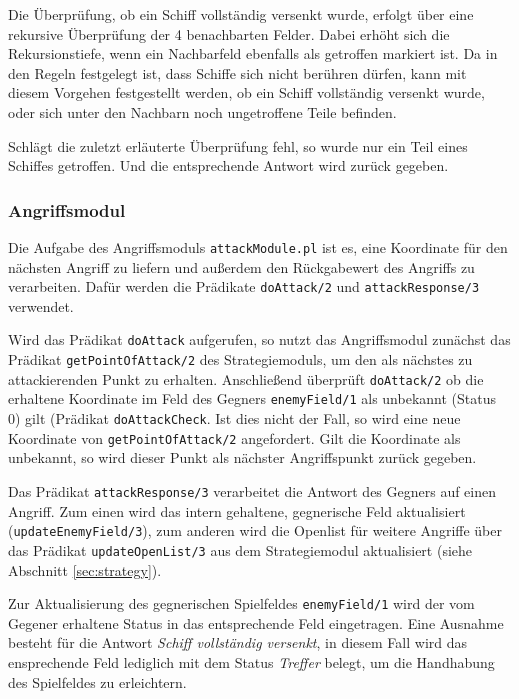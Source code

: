	Die Überprüfung, ob ein Schiff vollständig versenkt wurde, erfolgt über eine rekursive Überprüfung der 4 benachbarten Felder.
	Dabei erhöht sich die Rekursionstiefe, wenn ein Nachbarfeld ebenfalls als getroffen markiert ist. 
	Da in den Regeln festgelegt ist, dass Schiffe sich nicht berühren dürfen, kann mit diesem Vorgehen festgestellt werden, ob ein Schiff
	vollständig versenkt wurde, oder sich unter den Nachbarn noch ungetroffene Teile befinden.
	
	Schlägt die zuletzt erläuterte Überprüfung fehl, so wurde nur ein Teil eines Schiffes getroffen. Und die entsprechende Antwort wird zurück 
	gegeben.
	
	
	
\subsubsection{Angriffsmodul} \label{sec:attackModule}
	Die Aufgabe des Angriffsmoduls \texttt{attackModule.pl} ist es, eine Koordinate für den nächsten Angriff zu liefern und außerdem den 
	Rückgabewert des Angriffs zu verarbeiten. 
	Dafür werden die Prädikate \texttt{doAttack/2} und \texttt{attackResponse/3} verwendet. 
	
	Wird das Prädikat \texttt{doAttack} aufgerufen, so nutzt das Angriffsmodul zunächst das Prädikat \texttt{getPointOfAttack/2} des
	Strategiemoduls, um den als nächstes zu attackierenden Punkt zu erhalten. Anschließend überprüft \texttt{doAttack/2} 
	ob die erhaltene Koordinate im Feld des Gegners \texttt{enemyField/1} als unbekannt (Status 0) gilt (Prädikat \texttt{doAttackCheck}. 
	Ist dies nicht der Fall, so wird eine neue Koordinate von \texttt{getPointOfAttack/2} angefordert. 
	Gilt die Koordinate als unbekannt, so wird dieser Punkt als nächster Angriffspunkt zurück gegeben.
	
	Das Prädikat \texttt{attackResponse/3} verarbeitet die Antwort des Gegners auf einen Angriff. Zum einen wird das intern gehaltene, 
	gegnerische Feld aktualisiert (\texttt{updateEnemyField/3}), zum anderen wird die Openlist für weitere Angriffe über 
	das Prädikat \texttt{updateOpenList/3} aus dem Strategiemodul aktualisiert (siehe Abschnitt \ref{sec:strategy}).
	
	Zur Aktualisierung des gegnerischen Spielfeldes \texttt{enemyField/1} wird der vom Gegener erhaltene Status in das entsprechende 
	Feld eingetragen. Eine Ausnahme besteht für die Antwort \textit{Schiff vollständig versenkt}, in diesem Fall wird das ensprechende
	Feld lediglich mit dem Status \textit{Treffer} belegt, um die Handhabung des Spielfeldes zu erleichtern. 

